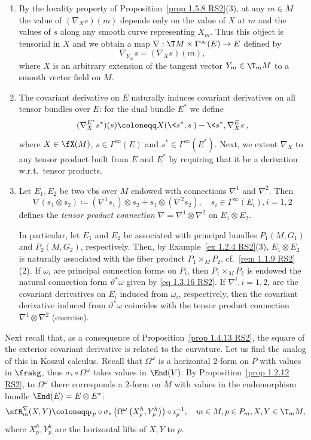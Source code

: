 \begin{rem}\label{rem 1.5.9 RS2}
    \begin{enumerate}
        \item By the locality property of Proposition~\ref{prop 1.5.8 RS2}(3), at any $m\in M$ the value of $(\nabla_X s)(m)$ depends only on the value of $X$ at $m$ and the values of $s$ along any smooth curve representing $X_m$. Thus this object is tensorial in $X$ and we obtain a map $\nabla:\T M\times\Gamma^\infty(E)\to E$ defined by
        \[\nabla_{Y_m}s=(\nabla_X s)(m),\]
        where $X$ is an arbitrary extension of the tangent vector $Y_m\in \T_mM$ to a smooth vector field on $M$.
        \item The covariant derivative on $E$ naturally induces covariant derivatives on all tensor bundles over $E$: for the dual bundle $E^\ast$ we define
        \[(\nabla^{E^\ast}_X s^\ast)(s)\coloneqq X(\<s^\ast,s\>)-\<s^\ast,\nabla_X^E s\>,\]
        where $X\in\fX(M)$, $s\in\Gamma^\infty(E)$ and $s^\ast\in\Gamma^\infty(E^\ast)$. Next, we extent $\nabla_X$ to any tensor product built from $E$ and $E^\ast$ by requiring that it be a derivation w.r.t.\ tensor products.
        \item Let $E_1,E_2$ be two \glspl{vb} over $M$ endowed with connections $\nabla^1$ and $\nabla^2$. Then
        \[\nabla(s_1\otimes s_2)\coloneqq (\nabla^1 s_1)\otimes s_2+s_1\otimes (\nabla^2 s_2), \quad s_i\in\Gamma^\infty(E_i),i=1,2\]
        defines the \emph{tensor product connection} $\nabla=\nabla^1\otimes\nabla^2$ on $E_1\otimes E_2$.

        In particular, let $E_1$ and $E_2$ be associated with principal bundles $P_1(M,G_1)$ and $P_2(M,G_2)$, respectively. Then, by Example~\ref{ex 1.2.4 RS2}(3), $E_1\otimes E_2$ is naturally associated with the fiber product $P_1\times_M P_2$, cf.\ \ref{rem 1.1.9 RS2}(2). If $\omega_i$ are principal connection forms on $P_i$, then $P_1\times_M P_2$ is endowed the natural connection form $\vartheta^\ast\omega$ given by \eqref{eq 1.3.16 RS2}. If $\nabla^i,i=1,2$, are the covariant derivatives on $E_i$ induced from $\omega_i$, respectively, then the covariant derivative induced from $\vartheta^\ast\omega$ coincides with the tensor product connection $\nabla^1\otimes \nabla^2$ (exercise).
    \end{enumerate}
\end{rem}

Next recall that, as a consequence of Proposition~\ref{prop 1.4.13 RS2}, the square of the exterior covariant derivative is related to the curvature. Let us find the analog of this in Koszul calculus. Recall that $\Omega^\omega$ is a horizontal $2$-form on $P$ with values in $\frakg$, thus $\sigma_\ast\circ \Omega^\omega$ takes values in $\End(V)$. By Proposition~\ref{prop 1.2.12 RS2}, to $\Omega^\omega$ there corresponds a $2$-form on $M$ with values in the endomorphism bundle $\End(E)=E\otimes E^\ast$:
\[\sfR^\nabla_m(X,Y)\coloneqq \iota_p\circ \sigma_\ast\left(\Omega^\omega\left(X_p^h,Y_p^h\right)\right)\circ\iota_p^{-1},\quad m\in M,p\in P_m,X,Y\in\T_m M,\label{eq def Rnabla}\]
where $X_p^h,Y_p^h$ are the horizontal lifts of $X,Y$ to $p$.

